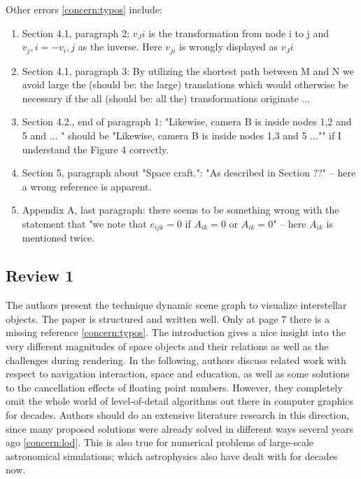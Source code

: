 \documentclass{article}
\begin{document}
Other errors \eqref{concern:typos} include:

\begin{enumerate}
\item Section 4.1, paragraph 2: $v_Ji$ is the transformation from node i to j and $v_j,i=-v_i,j$ as the inverse.
Here $v_{ji}$ is wrongly displayed as $v_Ji$
\item Section 4.1, paragraph 3: By utilizing the shortest path between M and N we avoid large the (should be: the large) translations which would otherwise be necessary if the all (should be: all the) transformations originate ...
\item Section 4.2., end of paragraph 1: "Likewise, camera B is inside nodes 1,2 and 5 and ...
" should be "Likewise, camera B is inside nodes 1,3 and 5 ..."" if I understand the Figure 4 correctly.
\item Section 5, paragraph about "Space craft.": "As described in Section ??" -- here a wrong reference is apparent.
\item Appendix A, last paragraph: there seems to be something wrong with the statement that "we note that $e_{ijk}=0$ if $A_{ik}=0$ or $A_{ik}=0$" -- here $A_{ik}$ is mentioned twice.
\end{enumerate}

\subsection*{Review 1}

The authors present the technique dynamic scene graph to visualize interstellar objects.
The paper is structured and written well.
Only at page 7 there is a missing reference \eqref{concern:typos}.
The introduction gives a nice insight into the very different magnitudes of space objects and their relations as well as the challenges during rendering.
In the following, authors discuss related work with respect to navigation interaction, space and education, as well as some solutions to the cancellation effects of floating point numbers.
However, they completely omit the whole world of level-of-detail algorithms out there in computer graphics for decades.
Authors should do an extensive literature research in this direction, since many proposed solutions were already solved in different ways several years ago \eqref{concern:lod}. 
This is also true for numerical problems of large-scale astronomical simulations; which astrophysics also have dealt with for decades now. 
\end{document}

